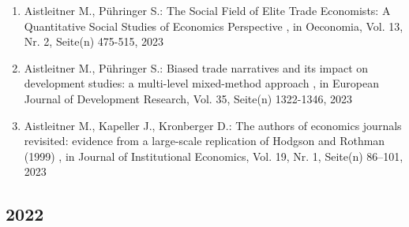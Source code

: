 \begin{enumerate}[leftmargin=*, labelsep=0.5cm]
	 \item Aistleitner M., Pühringer S.:  The Social Field of Elite Trade Economists: A Quantitative Social Studies of Economics Perspective  , in Oeconomia, Vol. 13, Nr. 2, Seite(n) 475-515, 2023
	 \item Aistleitner M., Pühringer S.:  Biased trade narratives and its impact on development studies: a multi-level mixed-method approach  , in European Journal of Development Research, Vol. 35, Seite(n) 1322-1346, 2023
	 \item Aistleitner M., Kapeller J., Kronberger D.:  The authors of economics journals revisited: evidence from a large-scale replication of Hodgson and Rothman (1999)  , in Journal of Institutional Economics, Vol. 19, Nr. 1, Seite(n) 86–101, 2023
\end{enumerate} 
 \subsection*{2022} 

